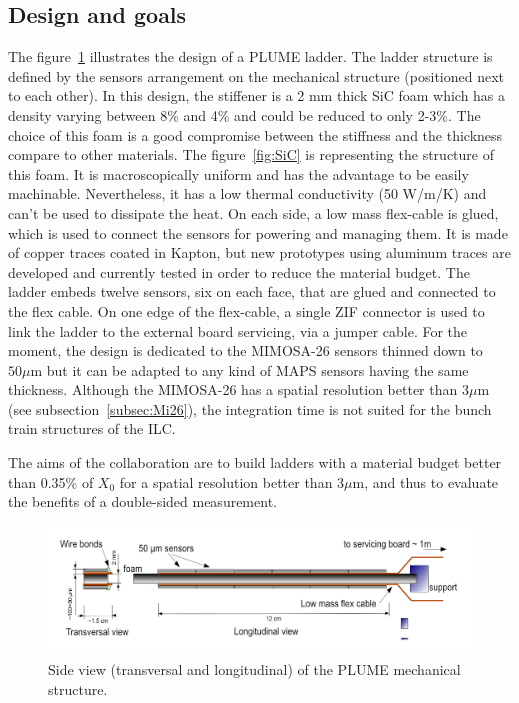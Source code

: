     \subsection{Design and goals}

    The figure~\ref{fig:PLUME} illustrates the design of a PLUME ladder.
    The ladder structure is defined by the sensors arrangement on the mechanical structure (positioned next to each other).
    In this design, the stiffener is a 2 mm thick \gls{SiC} foam which has a density varying between 8\% and 4\% and could be reduced to only 2-3\%.
    The choice of this foam is a good compromise between the stiffness and the thickness compare to other materials. 
    The figure~\ref{fig:SiC} is representing the structure of this foam.
    It is macroscopically uniform and has the advantage to be easily machinable.
    Nevertheless, it has a low thermal conductivity (50 W/m/K) and can't be used to dissipate the heat.
    On each side, a low mass flex-cable is glued, which is used to connect the sensors for powering and managing them.
    It is made of copper traces coated in Kapton, but new prototypes using aluminum traces are developed and currently tested in order to reduce the material budget.
    The ladder embeds twelve sensors, six on each face, that are glued and connected to the flex cable.
    On one edge of the flex-cable, a single \gls{ZIF} connector is used to link the ladder to the external board servicing, via a jumper cable.
    For the moment, the design is dedicated to the MIMOSA-26 sensors thinned down to $50 \mu\text{m}$ but it can be adapted to any kind of \gls{MAPS} sensors having the same thickness. 
    Although the MIMOSA-26 has a spatial resolution better than 3$\mu$m (see subsection~\ref{subsec:Mi26}), the integration time is not suited for the bunch train structures of the \gls{ILC}.

    The aims of the collaboration are to build ladders with a material budget better than 0.35\% of $X_0$ for a spatial resolution better than 3$\mu$m, and thus to evaluate the benefits of a double-sided measurement.

    \begin{figure}[!h]
      \centering
      \includegraphics[width = 15 cm]{Pictures/vxd/plume_finalGoal.png}
      \caption{Side view (transversal and longitudinal) of the PLUME mechanical structure.}
      \label{fig:PLUME}
    \end{figure}

